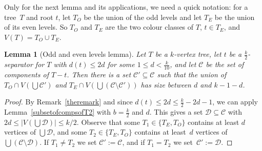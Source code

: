 \documentclass[12pt]{article}
\newtheorem{lemma}[theorem]{Lemma}
\begin{document}
 Only for the next lemma and its applications, we need a quick notation: for a tree~$T$ and root $t$, let $T_O$ be the union of the odd levels and let $T_E$ be the union of its even levels. So  $T_O$ and $T_E$ are the two colour classes of $T$, $t \in T_E$,  and  $V(T)=T_O\cup T_E$.

\begin{lemma}[Odd and even levels lemma]\label{oddandeven}
 Let $T$ be a $k$-vertex tree, let $t$ be a $\frac k2$-separator for $T$ with $d(t)\le 2d$ for some $1\le d<\frac k{10}$, and let $\mathcal C$ be the set of components of $T-t$. 
 Then there is a set $\mathcal C'\subseteq\mathcal C$   such that the union of  $T_O\cap V(\bigcup\mathcal  C')$ and  $T_E\cap V(\bigcup (\mathcal C\setminus\mathcal  C'))$ has size between $d$ and $k-1-d$.
\end{lemma}
\begin{proof}
By Remark~\ref{theremark} and since $d(t)\le 2d\le \frac k2-2d-1$, we can apply
Lemma~\ref{subsetofcompsofT2} 
 with $b=\frac k2$ and $d$. This gives a set   $\mathcal D\subseteq \mathcal C$ %
with 
$2d \le |V(\bigcup \mathcal D)|\le k/2$. Observe that some  $T_1\in \{ T_E, T_O\}$ contains at least $d$ vertices of $\bigcup\mathcal D$, and some  $T_2\in \{ T_E, T_O\}$ contains at least~$d$ vertices of $\bigcup(\mathcal C\setminus \mathcal D)$. If $T_1\neq T_2$ we  set $\mathcal C':=\mathcal C$, and if $T_1= T_2$ we  set~$\mathcal C':=\mathcal D$.
\end{proof}

\end{document}
